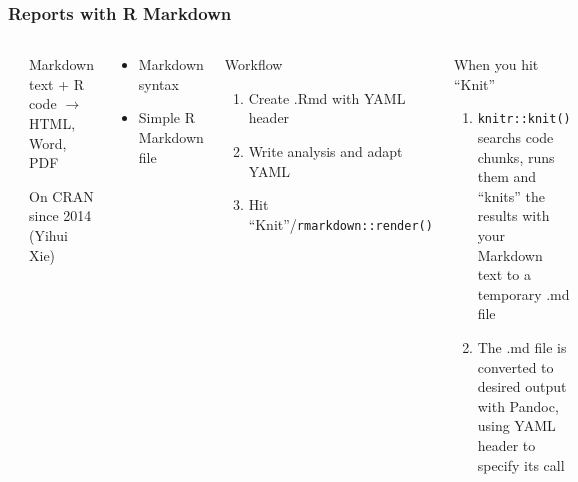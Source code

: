 \begin{frame}
	\frametitle{Reports with R Markdown}
	\begin{columns}
		\hspace{1cm}\includegraphics[width=0.3\textwidth]{../figs/rmarkdown.png}
		\begin{block}{Markdown text + R code}
			$\rightarrow$ HTML, Word, PDF
			
			On CRAN since 2014 (Yihui Xie)		
		\end{block}			
		
		\begin{example}
			\begin{itemize}
				\item Markdown syntax
				\item Simple R Markdown file
			\end{itemize}
		\end{example}
		
		\begin{block}{Workflow}
			\begin{enumerate}
				\item Create .Rmd with YAML header
				\item Write analysis and adapt YAML
				\item Hit ``Knit''/\texttt{rmarkdown::render()}
			\end{enumerate}
		\end{block}
	
		\begin{block}{When you hit ``Knit''}
			\begin{enumerate}
				\item \texttt{knitr::knit()} searchs code chunks, runs them and ``knits'' the results with your Markdown text to a temporary .md file
				\item The .md file is converted to desired output with Pandoc, using YAML header to specify its call 
			\end{enumerate}
		\end{block}
	
	\end{columns}
\end{frame}

